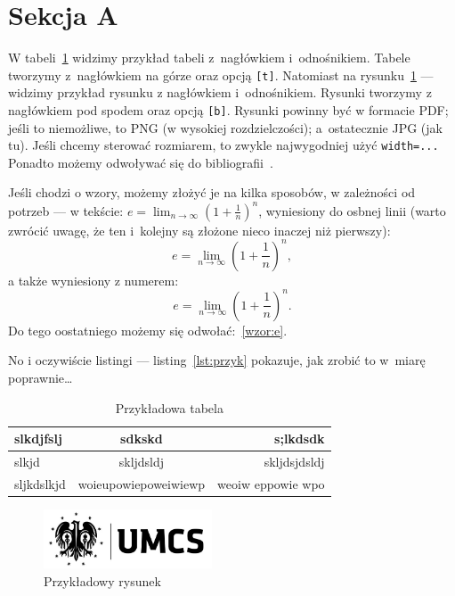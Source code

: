 \documentclass[a4paper,12pt]{book} %
\begin{document}
\section{Sekcja A}

W tabeli~\ref{tab:przyk} widzimy przykład tabeli z~nagłówkiem i~odnośnikiem. Tabele tworzymy z~nagłówkiem na górze oraz opcją \texttt{[t]}.
Natomiast na rysunku~\ref{rys:przyk} --- widzimy przykład rysunku z nagłówkiem i~odnośnikiem.
Rysunki tworzymy z nagłówkiem pod spodem oraz opcją \texttt{[b]}.
Rysunki powinny być w formacie PDF; jeśli to niemożliwe, to PNG (w wysokiej rozdzielczości); a~ostatecznie JPG (jak tu). Jeśli chcemy sterować rozmiarem, to zwykle najwygodniej użyć \texttt{width=...}
Ponadto możemy odwoływać się do bibliografii~\cite{bib:a, bib:b}.

Jeśli chodzi o wzory, możemy złożyć je na kilka sposobów, w zależności od potrzeb --- w tekście: $e=\lim_{n\to\infty}\left(1+\frac{1}{n}\right)^n$, wyniesiony do osbnej linii
(warto zwrócić uwagę, że ten i~kolejny są złożone nieco inaczej niż pierwszy):
\[e=\lim_{n\to\infty}\left(1+\frac{1}{n}\right)^n,\] a także wyniesiony z numerem:
\begin{equation}
e=\lim_{n\to\infty}\left(1+\frac{1}{n}\right)^n.
\label{wzor:e}
\end{equation}
Do tego oostatniego możemy się odwołać:~\eqref{wzor:e}.

No i oczywiście listingi --- listing~\ref{lst:przyk} pokazuje, jak zrobić to w~miarę poprawnie\ldots{}

\begin{table}[t]
\begin{center}
\caption{Przykładowa tabela}\label{tab:przyk}
 \begin{tabular}{l|c|r}
    slkdjfslj & sdkskd & s;lkdsdk \\
    \hline
    slkjd & skljdsldj& skljdsjdsldj \\
    sljkdslkjd& woieupowiepoweiwiewp & weoiw eppowie wpo \\
 \end{tabular}
\end{center}
\end{table}

\begin{figure}[b]
 \begin{center}
  \includegraphics[width=5cm]{LogoUMCS}
 \end{center}
 \caption{Przykładowy rysunek}\label{rys:przyk}
\end{figure}
\end{document}
